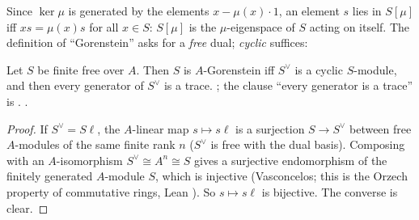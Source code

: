 Since $\ker\mu$ is generated by the elements $x-\mu(x)\cdot1$, an element $s$ lies in $S[\mu]$ iff $xs=\mu(x)s$ for all $x\in S$: $S[\mu]$ is the
$\mu$-eigenspace of $S$ acting on itself. The definition of ``Gorenstein'' asks for a \emph{free} dual; \emph{cyclic} suffices:

\begin{lemma}\label{lem:s06-cyclic}
Let $S$ be finite free over $A$. Then $S$ is $A$-Gorenstein iff $S^\vee$ is a cyclic $S$-module, and then every generator of $S^\vee$ is a
trace. \stproved{} ; the clause ``every generator is a trace'' is . \stformalized{}.
\end{lemma}
\begin{proof}
If $S^\vee=S\ell$, the $A$-linear map $s\mapsto s\ell$ is a surjection $S\to S^\vee$ between free $A$-modules of the same finite rank
$n$ ($S^\vee$ is free with the dual basis). Composing with an $A$-isomorphism $S^\vee\cong A^n\cong S$ gives a surjective endomorphism
of the finitely generated $A$-module $S$, which is injective (Vasconcelos; this is the Orzech property of commutative rings, Lean
). So $s\mapsto s\ell$ is bijective. The converse is clear.
\end{proof}

